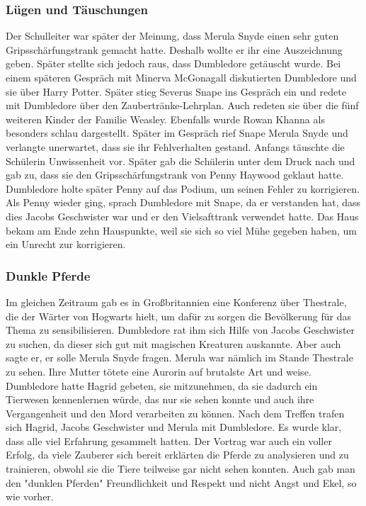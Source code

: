 \documentclass[a4paper, 10pt]{article}
\begin{document}
\subsubsection*{Lügen und Täuschungen}
Der Schulleiter war später der Meinung, dass Merula Snyde einen sehr guten Gripsschärfungstrank gemacht hatte. Deshalb wollte er ihr eine Auszeichnung geben. Später stellte sich jedoch raus, dass Dumbledore getäuscht wurde.
\vspace{10pt}
\newline
{}  
Bei einem späteren Gespräch mit Minerva McGonagall diskutierten Dumbledore und sie über Harry Potter. Später stieg Severus Snape ins Gespräch ein und redete mit Dumbledore über den Zaubertränke-Lehrplan. Auch redeten sie über die fünf weiteren Kinder der Familie Weasley. Ebenfalls wurde Rowan Khanna als besonders schlau dargestellt.
\vspace{10pt}
\newline
{}  
Später im Gespräch rief Snape Merula Snyde und verlangte unerwartet, dass sie ihr Fehlverhalten gestand. Anfangs täuschte die Schülerin Unwissenheit vor. Später gab die Schülerin unter dem Druck nach und gab zu, dass sie den Gripsschärfungstrank von Penny Haywood geklaut hatte. Dumbledore holte später Penny auf das Podium, um seinen Fehler zu korrigieren. Als Penny wieder ging, sprach Dumbledore mit Snape, da er verstanden hat, dass dies Jacobs Geschwister war und er den Vielsafttrank verwendet hatte. Das Haus bekam am Ende zehn Hauspunkte, weil sie sich so viel Mühe gegeben haben, um ein Unrecht zur korrigieren.
\subsubsection*{Dunkle Pferde}
Im gleichen Zeitraum gab es in Großbritannien eine Konferenz über Thestrale, die der Wärter von Hogwarts hielt, um dafür zu sorgen die Bevölkerung für das Thema zu sensibilisieren. Dumbledore rat ihm sich Hilfe von Jacobs Geschwister zu suchen, da dieser sich gut mit magischen Kreaturen auskannte. Aber auch sagte er, er solle Merula Snyde fragen. Merula war nämlich im Stande Thestrale zu sehen. Ihre Mutter tötete eine Aurorin auf brutalste Art und weise. Dumbledore hatte Hagrid gebeten, sie mitzunehmen, da sie dadurch ein Tierwesen kennenlernen würde, das nur sie sehen konnte und auch ihre Vergangenheit und den Mord verarbeiten zu können.
\vspace{10pt}
\newline
{}  
Nach dem Treffen trafen sich Hagrid, Jacobs Geschwister und Merula mit Dumbledore. Es wurde klar, dass alle viel Erfahrung gesammelt hatten. Der Vortrag war auch ein voller Erfolg, da viele Zauberer sich bereit erklärten die Pferde zu analysieren und zu trainieren, obwohl sie die Tiere teilweise gar nicht sehen konnten. Auch gab man den "dunklen Pferden" Freundlichkeit und Respekt und nicht Angst und Ekel, so wie vorher.
\end{document}
